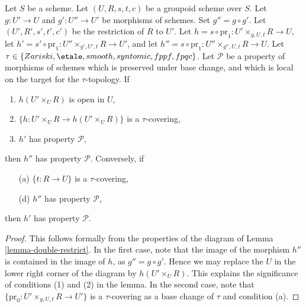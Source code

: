 \begin{lemma}
\label{lemma-double-restrict-property}
Let $S$ be a scheme.
Let $(U, R, s, t, c)$ be a groupoid scheme over $S$.
Let $g : U' \to U$ and $g' : U'' \to U'$ be morphisms of schemes.
Set $g'' = g \circ g'$.
Let $(U', R', s', t', c')$ be the restriction of $R$ to $U'$.
Let $h = s \circ \text{pr}_1 : U' \times_{g, U, t} R \to U$,
let $h' = s' \circ \text{pr}_1 : U'' \times_{g', U', t} R \to U'$, and
let $h'' = s \circ \text{pr}_1 : U'' \times_{g'', U, t} R \to U$.
Let $\tau \in \{Zariski, \linebreak[0] \etale, \linebreak[0]
smooth, \linebreak[0] syntomic, \linebreak[0] fppf, \linebreak[0] fpqc\}$. Let
$\mathcal{P}$ be a property of morphisms of schemes
which is preserved under base change, and which
is local on the target for the $\tau$-topology. If
\begin{enumerate}
\item $h(U' \times_U R)$ is open in $U$,
\item $\{h : U' \times_U R \to h(U' \times_U R)\}$ is a $\tau$-covering,
\item $h'$ has property $\mathcal{P}$,
\end{enumerate}
then $h''$ has property $\mathcal{P}$. Conversely, if
\begin{enumerate}
\item[(a)] $\{t : R \to U\}$ is a $\tau$-covering,
\item[(d)] $h''$ has property $\mathcal{P}$,
\end{enumerate}
then $h'$ has property $\mathcal{P}$.
\end{lemma}

\begin{proof}
This follows formally from the properties of the diagram of
Lemma \ref{lemma-double-restrict}.
In the first case, note that the image of the morphism
$h''$ is contained in the image of $h$, as $g'' = g \circ g'$.
Hence we may replace the $U$ in the lower right corner of the
diagram by $h(U' \times_U R)$. This explains the significance of
conditions (1) and (2) in the lemma. In the second case, note that
$\{\text{pr}_0 : U' \times_{g, U, t} R \to U'\}$ is a $\tau$-covering
as a base change of $\tau$ and condition (a).
\end{proof}






